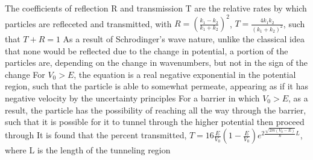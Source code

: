 \documentclass[11 pt, twoside]{article}
\newenvironment{outline*}
{
	\begin{outline}[enumerate]
	}
	{\end{outline}
}
\begin{document}
\begin{outline*}
		\3 The coefficients of reflection R and transmission T are the relative rates by which particles are refleceted and transmitted, with $R = (\frac{k_1 - k_2}{k_1 + k_2})^2$, $T = \frac{4k_1k_2}{(k_1 + k_2)^2}$, such that $T + R = 1$
	\2 As a result of Schrodinger's wave nature, unlike the classical idea that none would be reflected due to the change in potential, a portion of the particles are, depending on the change in wavenumbers, but not in the sign of the change
	\2 For $V_0 > E$, the equation is a real negative exponential in the potential region, such that the particle is able to somewhat permeate, appearing as if it has negative velocity by the uncertainty principles
	\2 For a barrier in which $V_0 > E$, as a result, the particle has the possibility of reaching all the way through the barrier, such that it is possible for it to tunnel through the higher potential then proceed through
		\3 It is found that the percent transmitted, $T = 16\frac{E}{V_0}(1 - \frac{E}{V_0})e^{2\frac{\sqrt{2m(V_0 - E)}}{\hbar}L}$, where L is the length of the tunneling region
\end{outline*}
\end{document}
